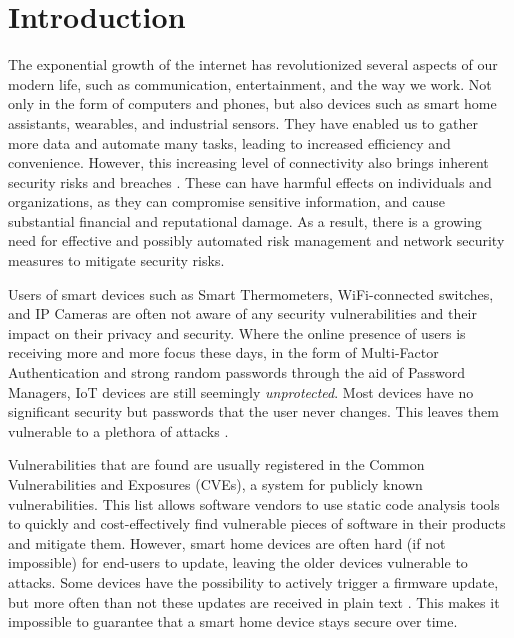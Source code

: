 \section{Introduction}
\label{sec:introduction}
The exponential growth of the internet has revolutionized several aspects of our modern life, such as communication, entertainment, and the way we work. Not only in the form of computers and phones, but also devices such as smart home assistants, wearables, and industrial sensors. They have enabled us to gather more data and automate many tasks, leading to increased efficiency and convenience. However, this increasing level of connectivity also brings inherent security risks and breaches \cite{khandelwal2016friday, wei2018casino}.  These can have harmful effects on individuals and organizations, as they can compromise sensitive information, and cause substantial financial and reputational damage.  As a result, there is a growing need for effective and possibly automated risk management and network security measures to mitigate security risks.


Users of smart devices such as Smart Thermometers, WiFi-connected switches, and IP Cameras are often not aware of any security vulnerabilities and their impact on their privacy and security. Where the online presence of users is receiving more and more focus these days, in the form of Multi-Factor Authentication and strong random passwords through the aid of Password Managers, IoT devices are still seemingly \emph{unprotected}. Most devices have no significant security but passwords that the user never changes. This leaves them vulnerable to a plethora of attacks \cite{hamza2019detecting, paudel2019detecting}. 

Vulnerabilities that are found are usually registered in the Common Vulnerabilities and Exposures (CVEs), a system for publicly known vulnerabilities. This list allows software vendors to use static code analysis tools to quickly and cost-effectively find vulnerable pieces of software in their products and mitigate them. However, smart home devices are often hard (if not impossible) for end-users to update, leaving the older devices vulnerable to attacks. Some devices have the possibility to actively trigger a firmware update, but more often than not these updates are received in plain text \cite{wurm2016security}. This makes it impossible to guarantee that a smart home device stays secure over time.

